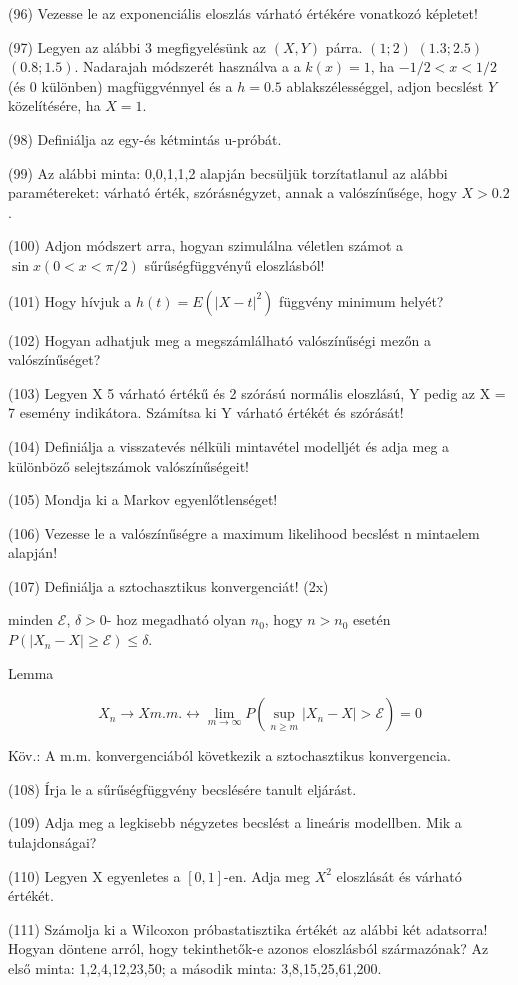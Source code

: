 \documentclass[12p]{article}
\begin{document}
(96) Vezesse le az exponenciális eloszlás várható értékére vonatkozó képletet!

(97) Legyen az alábbi 3 megfigyelésünk az $(X, Y)$ párra. $(1;2)$ $(1.3;2.5)$ $(0.8;1.5)$. Nadarajah
módszerét használva a a $k(x) = 1$, ha $-1/2 < x < 1/2$ (és 0 különben) magfüggvénnyel és a $h = 0.5$ ablakszélességgel, adjon becslést $Y$ közelítésére, ha $X = 1$.

(98) Definiálja az egy-és kétmintás u-próbát.

(99) Az alábbi minta: 0,0,1,1,2 alapján becsüljük torzítatlanul az alábbi paramétereket:
várható érték, szórásnégyzet, annak a valószínűsége, hogy $X > 0.2$.

(100) Adjon módszert arra, hogyan szimulálna véletlen számot a $\sin x (0 < x < \pi/2)$ sűrűségfüggvényű eloszlásból!

(101) Hogy hívjuk a $h(t) = E(|X - t|^2)$ függvény minimum helyét?

(102) Hogyan adhatjuk meg a megszámlálható valószínűségi mezőn a valószínűséget?

(103) Legyen X 5 várható értékű és 2 szórású normális eloszlású, Y pedig az X = 7 esemény indikátora. Számítsa ki Y várható értékét és szórását!

(104)  Definiálja a visszatevés nélküli mintavétel modelljét és adja meg a különböző selejtszámok valószínűségeit!

(105) Mondja ki a Markov egyenlőtlenséget!

(106) Vezesse le a valószínűségre a maximum likelihood becslést n mintaelem alapján!

(107) Definiálja a sztochasztikus konvergenciát! (2x)

 minden $\mathcal{E}$, $\delta>0$-
hoz megadható olyan $n_0$, hogy $n>n_0$ esetén $P(|X_n-X| \geq \mathcal{E}) \leq \delta$.

Lemma

$$X_n \rightarrow X m.m. \leftrightarrow \lim_{m \rightarrow \infty} P(\sup_{n \geq m} |X_n - X| > \mathcal{E}) = 0$$

Köv.: A m.m. konvergenciából következik a
sztochasztikus konvergencia.


(108) Írja le a sűrűségfüggvény becslésére tanult eljárást.

(109) Adja meg a legkisebb négyzetes becslést a lineáris modellben. Mik a tulajdonságai?

(110) Legyen X egyenletes a $[0, 1]$-en. Adja meg $X^2$ eloszlását és várható értékét.

(111) Számolja ki a Wilcoxon próbastatisztika értékét az alábbi két adatsorra! Hogyan döntene arról, hogy tekinthetők-e azonos eloszlásból származónak? Az első minta: 1,2,4,12,23,50;
a második minta: 3,8,15,25,61,200.
\end{document}
